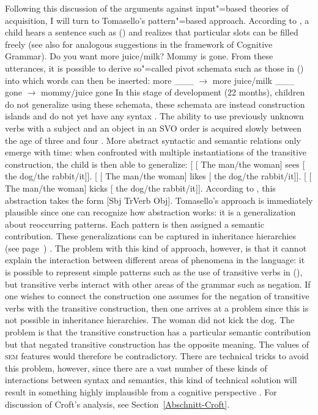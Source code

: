 Following this discussion of the arguments against input"=based theories of acquisition, I will turn to Tomasello's pattern"=based approach\indexcxgstart.
According to \citet[Section~4.2.1]{Tomasello2003a}, a child hears a sentence such as () and realizes that particular slots can
be filled freely (see also  for analogous suggestions in the framework of Cognitive Grammar).
\eal
\ex Do you want more juice/milk?
\ex Mommy is gone.
\zl
From these utterances, it is possible to derive so"=called pivot schemata such as those in () into which words
can then be inserted:
\eal
\ex more \_\_\_ $\to$ more juice/milk
\ex \_\_\_ gone $\to$ mommy/juice gone
\zl
In this stage of development (22 months), children do not generalize using these schemata, these schemata are instead construction islands
and do not yet have any syntax \citep{TADR97a}. The ability to use previously unknown verbs with a subject and an object in an SVO order
is acquired slowly between the age of three and four \citep[--129]{Tomasello2003a}.
More abstract syntactic and semantic relations only emerge with time: when confronted with multiple instantiations of the transitive construction,
the child is then able to generalize:
\eal
\label{Beispiele-fuer-Transitivkonstruktion}
\ex {}[ [ The man/the woman] sees  [ the dog/the rabbit/it]].
\ex {}[ [ The man/the woman] likes [ the dog/the rabbit/it]].
\ex {}[ [ The man/the woman] kicks [ the dog/the rabbit/it]].
\zl
According to \citet[]{Tomasello2003a}, this abstraction takes the form [Sbj TrVerb Obj]. 
Tomasello's approach is immediately plausible since one can recognize how abstraction works:
it is a generalization about reoccurring patterns. Each pattern is then assigned a semantic contribution.
These generalizations can be captured in inheritance hierarchies (see page~\pageref{Seite-Typhierarchie}) \citep[]{Croft2001a}.
The problem with this kind of approach, however, is that it cannot explain the interaction between different areas of phenomena in the
language: it is possible to represent simple patterns such as the use of transitive verbs in
(), but transitive verbs interact with other areas of the grammar such as negation. If one wishes to connect the construction one assumes for the negation
of transitive verbs with the transitive construction, then one arrives at a problem since this is not possible in
inheritance hierarchies.
\ea
The woman did not kick the dog.
\z
\largerpage
The problem is that the transitive construction has a particular semantic contribution but that
negated transitive construction has the opposite meaning. The values of \textsc{sem} features would
therefore be contradictory. There are technical tricks to avoid this problem, however, since there
are a vast number of these kinds of interactions between syntax and semantics, this kind of
technical solution will result in something highly implausible from a cognitive perspective
\citep{Mueller2006d,Mueller2007d,MuellerLehrbuch1,MuellerPersian,MWArgSt}. 
For discussion of Croft's analysis, see Section~\ref{Abschnitt-Croft}.


